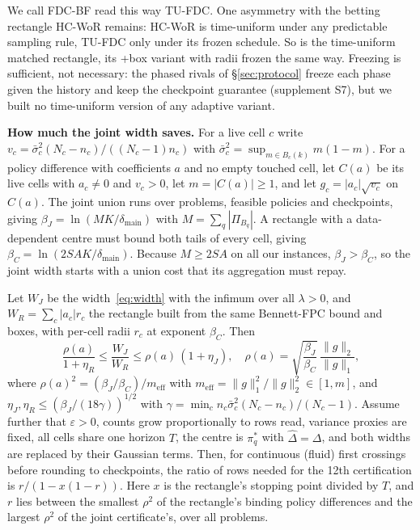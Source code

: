 \documentclass[sigconf,anonymous,review]{acmart}
\newcommand{\eps}{\varepsilon}
\newcommand{\dmain}{\delta_{\text{main}}}
\newcommand{\meff}{m_{\text{eff}}}
\begin{document}
We call FDC-BF read this way TU-FDC. One asymmetry with the betting rectangle HC-WoR remains: HC-WoR is time-uniform under any predictable sampling rule, TU-FDC only under its frozen schedule. So is the time-uniform matched rectangle, its +box variant with radii frozen the same way. Freezing is sufficient, not necessary: the phased rivals of \S\ref{sec:protocol} freeze each phase given the history and keep the checkpoint guarantee (supplement S7), but we built no time-uniform version of any adaptive variant.

\textbf{How much the joint width saves.} For a live cell $c$ write $v_c = \bar\sigma_c^2 (N_c - n_c)/((N_c - 1)n_c)$ with $\bar\sigma_c^2 = \sup_{m \in B_c(k)} m(1-m)$. For a policy difference with coefficients $a$ and no empty touched cell, let $C(a)$ be its live cells with $a_c \ne 0$ and $v_c > 0$, let $m = |C(a)| \ge 1$, and let $g_c = |a_c|\sqrt{v_c}$ on $C(a)$. The joint union runs over problems, feasible policies and checkpoints, giving $\beta_J = \ln(MK/\dmain)$ with $M = \sum_q |\Pi_{B_q}|$. A rectangle with a data-dependent centre must bound both tails of every cell, giving $\beta_C = \ln(2SAK/\dmain)$. Because $M \ge 2SA$ on all our instances, $\beta_J > \beta_C$, so the joint width starts with a union cost that its aggregation must repay.

\begin{proposition}\label{prop:width}
Let $W_J$ be the width~\eqref{eq:width} with the infimum over all $\lambda>0$, and $W_R = \sum_c |a_c| r_c$ the rectangle built from the same Bennett-FPC bound and boxes, with per-cell radii $r_c$ at exponent $\beta_C$. Then
\[
\frac{\rho(a)}{1+\eta_R} \le \frac{W_J}{W_R} \le \rho(a)\,(1+\eta_J),\quad
\rho(a) = \sqrt{\frac{\beta_J}{\beta_C}}\,\frac{\|g\|_2}{\|g\|_1},
\]
where $\rho(a)^2 = (\beta_J/\beta_C)/\meff$ with $\meff = \|g\|_1^2/\|g\|_2^2 \in [1, m]$, and $\eta_J, \eta_R \le (\beta_J/(18\gamma))^{1/2}$ with $\gamma = \min_c n_c \bar\sigma_c^2 (N_c-n_c)/(N_c-1)$. Assume further that $\eps > 0$, counts grow proportionally to rows read, variance proxies are fixed, all cells share one horizon $T$, the centre is $\pi^*_q$ with $\hat\Delta = \Delta$, and both widths are replaced by their Gaussian terms. Then, for continuous (fluid) first crossings before rounding to checkpoints, the ratio of rows needed for the 12th certification is $r/(1 - x(1-r))$. Here $x$ is the rectangle's stopping point divided by $T$, and $r$ lies between the smallest $\rho^2$ of the rectangle's binding policy differences and the largest $\rho^2$ of the joint certificate's, over all problems.
\end{proposition}
\end{document}
